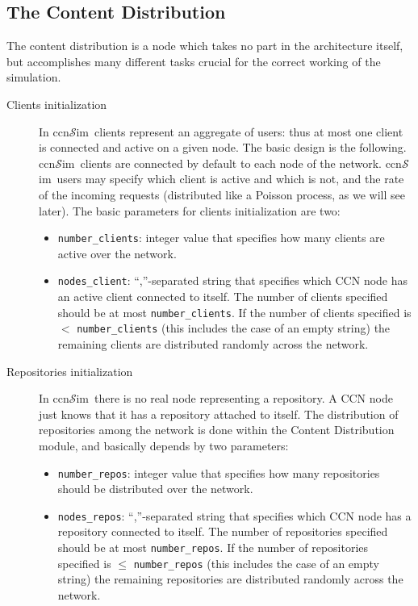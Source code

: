 \documentclass{article}
\newcommand{\ccnsim}{ccn$\mathcal{S}$im}
\begin{document}
\subsection{The Content Distribution}
The content distribution is a node which takes no part in the architecture itself, but accomplishes many different tasks crucial for the correct working of the simulation. 
\begin{description}
    \item[Clients initialization] In \ccnsim\ clients represent an aggregate of users: thus at most one client is connected and active on a given node. The basic design is the following. \ccnsim\ clients are connected by default to each node of the network. \ccnsim\ users may specify which client is active and which is not, and the rate of the incoming requests (distributed like a Poisson process, as we will see later). The basic parameters for clients initialization are two:
	\begin{itemize}
	    \item \verb|number_clients|: integer value that specifies how many clients are active over the network. 
	    \item \verb|nodes_client|: ``,''-separated string that specifies which CCN node has an active client connected to itself.  The number of clients specified should be at most \verb|number_clients|. If the number of clients specified is $<$ \verb|number_clients| (this includes the case of an empty string) the remaining clients are distributed randomly across the network. 
	\end{itemize}
    \item[Repositories initialization]  In \ccnsim\ there is no real node representing a repository. A CCN node just  knows that it has a repository attached to itself. The distribution of repositories among the network is done within the Content Distribution module, and basically depends by two parameters:
	\begin{itemize}
	    \item \verb|number_repos|: integer value that specifies how many repositories should be distributed over the network.
	    \item \verb|nodes_repos|: ``,''-separated string that specifies which CCN node has a repository connected to itself.  The number of repositories specified should be at most \verb|number_repos|. If the number of repositories specified is $\leq$ \verb|number_repos| (this includes the case of an empty string) the remaining repositories are distributed randomly across the network. 

\end{itemize}
\end{description}
\end{document}
